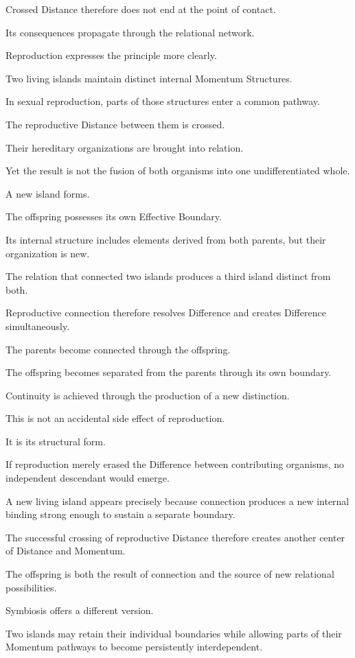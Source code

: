 Crossed Distance therefore does not end at the point of contact.

Its consequences propagate through the relational network.

Reproduction expresses the principle more clearly.

Two living islands maintain distinct internal Momentum Structures.

In sexual reproduction, parts of those structures enter a common pathway.

The reproductive Distance between them is crossed.

Their hereditary organizations are brought into relation.

Yet the result is not the fusion of both organisms into one undifferentiated whole.

A new island forms.

The offspring possesses its own Effective Boundary.

Its internal structure includes elements derived from both parents, but their organization is new.

The relation that connected two islands produces a third island distinct from both.

Reproductive connection therefore resolves Difference and creates Difference simultaneously.

The parents become connected through the offspring.

The offspring becomes separated from the parents through its own boundary.

Continuity is achieved through the production of a new distinction.

This is not an accidental side effect of reproduction.

It is its structural form.

If reproduction merely erased the Difference between contributing organisms, no independent descendant would emerge.

A new living island appears precisely because connection produces a new internal binding strong enough to sustain a separate boundary.

The successful crossing of reproductive Distance therefore creates another center of Distance and Momentum.

The offspring is both the result of connection and the source of new relational possibilities.

Symbiosis offers a different version.

Two islands may retain their individual boundaries while allowing parts of their Momentum pathways to become persistently interdependent.

